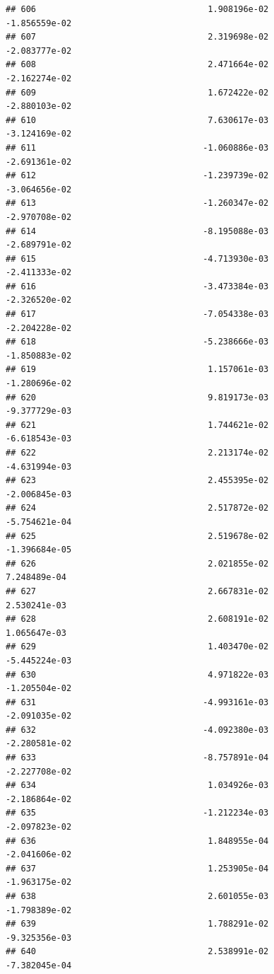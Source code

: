 \documentclass[
]{article}
\begin{document}
\begin{verbatim}
## 606                                  1.908196e-02          -1.856559e-02
## 607                                  2.319698e-02          -2.083777e-02
## 608                                  2.471664e-02          -2.162274e-02
## 609                                  1.672422e-02          -2.880103e-02
## 610                                  7.630617e-03          -3.124169e-02
## 611                                 -1.060886e-03          -2.691361e-02
## 612                                 -1.239739e-02          -3.064656e-02
## 613                                 -1.260347e-02          -2.970708e-02
## 614                                 -8.195088e-03          -2.689791e-02
## 615                                 -4.713930e-03          -2.411333e-02
## 616                                 -3.473384e-03          -2.326520e-02
## 617                                 -7.054338e-03          -2.204228e-02
## 618                                 -5.238666e-03          -1.850883e-02
## 619                                  1.157061e-03          -1.280696e-02
## 620                                  9.819173e-03          -9.377729e-03
## 621                                  1.744621e-02          -6.618543e-03
## 622                                  2.213174e-02          -4.631994e-03
## 623                                  2.455395e-02          -2.006845e-03
## 624                                  2.517872e-02          -5.754621e-04
## 625                                  2.519678e-02          -1.396684e-05
## 626                                  2.021855e-02           7.248489e-04
## 627                                  2.667831e-02           2.530241e-03
## 628                                  2.608191e-02           1.065647e-03
## 629                                  1.403470e-02          -5.445224e-03
## 630                                  4.971822e-03          -1.205504e-02
## 631                                 -4.993161e-03          -2.091035e-02
## 632                                 -4.092380e-03          -2.280581e-02
## 633                                 -8.757891e-04          -2.227708e-02
## 634                                  1.034926e-03          -2.186864e-02
## 635                                 -1.212234e-03          -2.097823e-02
## 636                                  1.848955e-04          -2.041606e-02
## 637                                  1.253905e-04          -1.963175e-02
## 638                                  2.601055e-03          -1.798389e-02
## 639                                  1.788291e-02          -9.325356e-03
## 640                                  2.538991e-02          -7.382045e-04

\end{verbatim}
\end{document}
